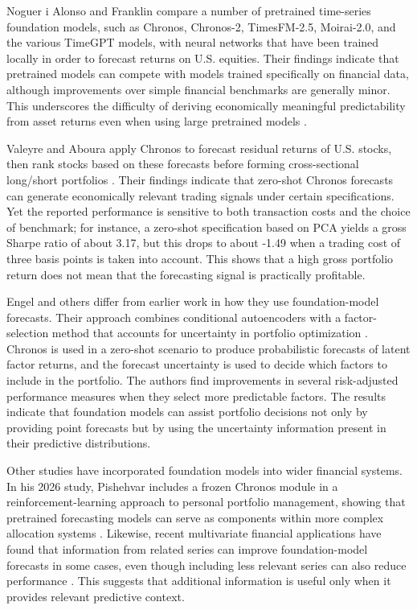 \documentclass[12pt,a4paper,twoside,openany]{book}
\begin{document}
Noguer i Alonso and Franklin compare a number of pretrained time-series foundation models, such as Chronos, Chronos-2, TimesFM-2.5, Moirai-2.0, and the various TimeGPT models, with neural networks that have been trained locally in order to forecast returns on U.S. equities. Their findings indicate that pretrained models can compete with models trained specifically on financial data, although improvements over simple financial benchmarks are generally minor. This underscores the difficulty of deriving economically meaningful predictability from asset returns even when using large pretrained models \cite{noguer2026pretrained}.

Valeyre and Aboura apply Chronos to forecast residual returns of U.S. stocks, then rank stocks based on these forecasts before forming cross-sectional long/short portfolios \cite{valeyre2024llms}. Their findings indicate that zero-shot Chronos forecasts can generate economically relevant trading signals under certain specifications. Yet the reported performance is sensitive to both transaction costs and the choice of benchmark; for instance, a zero-shot specification based on PCA yields a gross Sharpe ratio of about 3.17, but this drops to about -1.49 when a trading cost of three basis points is taken into account. This shows that a high gross portfolio return does not mean that the forecasting signal is practically profitable.

Engel and others differ from earlier work in how they use foundation-model forecasts. Their approach combines conditional autoencoders with a factor-selection method that accounts for uncertainty in portfolio optimization \cite{engel2025scaling}. Chronos is used in a zero-shot scenario to produce probabilistic forecasts of latent factor returns, and the forecast uncertainty is used to decide which factors to include in the portfolio. The authors find improvements in several risk-adjusted performance measures when they select more predictable factors. The results indicate that foundation models can assist portfolio decisions not only by providing point forecasts but by using the uncertainty information present in their predictive distributions.

Other studies have incorporated foundation models into wider financial systems. In his 2026 study, Pishehvar includes a frozen Chronos module in a reinforcement-learning approach to personal portfolio management, showing that pretrained forecasting models can serve as components within more complex allocation systems \cite{pishehvar2026threephase}. Likewise, recent multivariate financial applications have found that information from related series can improve foundation-model forecasts in some cases, even though including less relevant series can also reduce performance \cite{das2026multivariate}. This suggests that additional information is useful only when it provides relevant predictive context.
\end{document}
